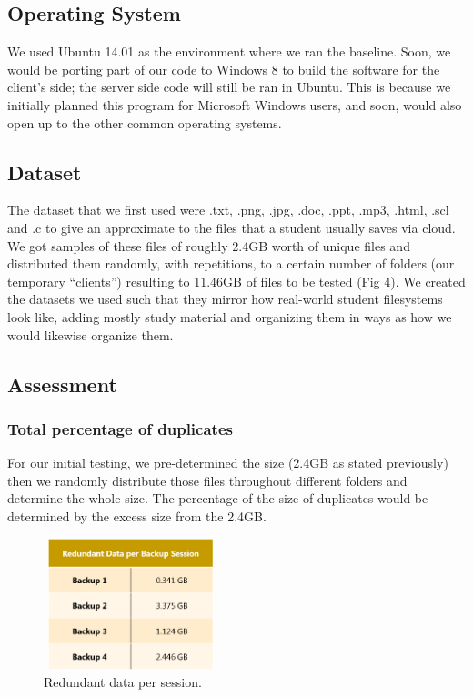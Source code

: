 \documentclass[journal]{IEEEtran}
\begin{document}
\subsection{Operating System}
We used Ubuntu 14.01 as the environment where we ran the baseline. Soon, we would be porting part of our code to Windows 8 to build the software for the client’s side; the server side code will still be ran in Ubuntu. This is because we initially planned this program for Microsoft Windows users, and soon, would also open up to the other common operating systems.

\subsection{Dataset}
The dataset that we first used were .txt, .png, .jpg, .doc, .ppt, .mp3, .html, .scl and .c to give an approximate to the files that a student usually saves via cloud. We got samples of these files of roughly 2.4GB worth of unique files and distributed them randomly, with repetitions, to a certain number of folders (our temporary “clients”) resulting to 11.46GB of files to be tested (Fig 4). We created the datasets we used such that they mirror how real-world student filesystems look like, adding mostly study material and organizing them in ways as how we would likewise organize them.

\subsection{Assessment}
\subsubsection{Total percentage of duplicates}
For our initial testing, we pre-determined the size (2.4GB as stated previously) then we randomly distribute those files throughout different folders and determine the whole size. The percentage of the size of duplicates would be determined by the excess size from the 2.4GB.

\begin{figure}[!t]
\centering
\includegraphics[height=1.5in, width=2in]{image1.png}
\caption{Redundant data per session.}
\end{figure}
\end{document}
